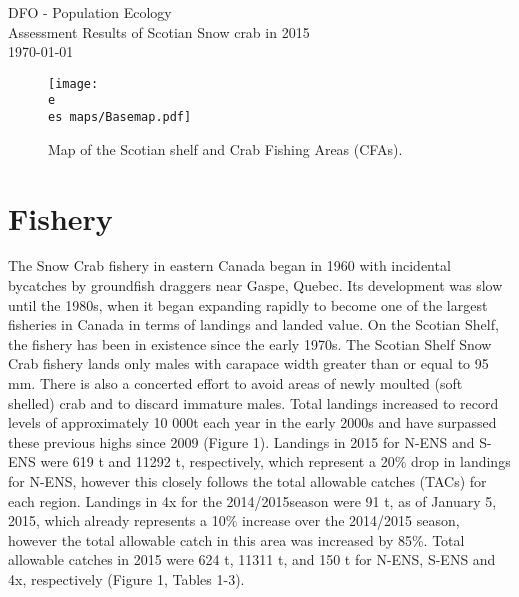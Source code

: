 \documentclass[paper=a4, fontsize=11pt]{article}
\newcommand{\e}{\string~/ecomod_data/}   %
\newcommand{\es}{snowcrab/}
\begin{document}
  \begin{titlepage}
  \vspace*{\fill}
  \begin{center}
    {DFO - Population Ecology}\\[0.5cm]
    {Assessment Results of Scotian Snow crab in 2015}\\[0.4cm]
    {\normalsize\today}
\begin{figure} [h]
\centering
  \texttt{[image: \\e \\es maps/Basemap.pdf]}
  \caption{Map of the Scotian shelf and Crab Fishing Areas (CFAs).}
 \end{figure}
 \end{center}
\vspace*{\fill}
\end{titlepage}


\section{Fishery}
The Snow Crab fishery in eastern Canada began in 1960 with incidental bycatches by groundfish draggers near Gaspe, Quebec. Its development was slow until the 1980s, when it began expanding rapidly to become one of the largest fisheries in Canada in terms of landings and landed value. On the Scotian Shelf, the fishery has been in existence since the early 1970s. The Scotian Shelf Snow Crab fishery lands only males with carapace width greater than or equal to 95 mm. There is also a concerted effort to avoid areas of newly moulted (soft shelled) crab and to discard immature males. Total landings increased to record levels of approximately 10 000t each year in the early 2000s and have surpassed these previous highs since 2009 (Figure 1). Landings in 2015 for N-ENS and S-ENS were 619 t and 11292 t, respectively, which represent a 20\% drop in landings for N-ENS, however this closely follows the total allowable catches (TACs) for each region. Landings in 4x for the 2014/2015season were 91 t, as of January 5, 2015, which already represents a 10\% increase over the 2014/2015 season, however the total allowable catch in this area was increased by 85\%. Total allowable catches in 2015 were 624 t, 11311 t, and 150 t for N-ENS, S-ENS and 4x, respectively (Figure 1, Tables 1-3). \\
\end{document}
